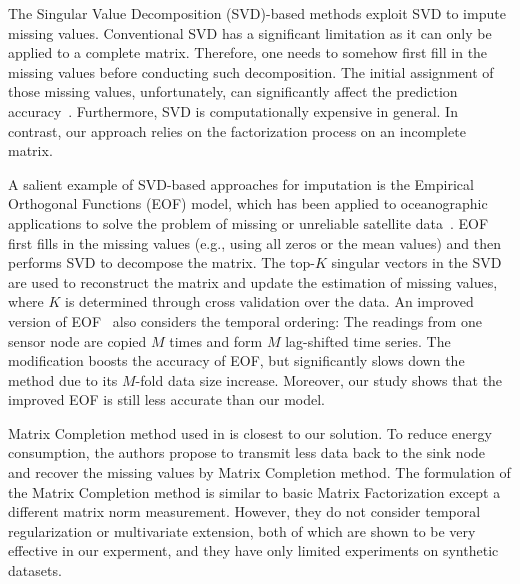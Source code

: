The Singular Value Decomposition (SVD)-based methods exploit SVD to impute missing values.
Conventional SVD has a significant
limitation as it can only be applied to a complete matrix.  Therefore,
one needs to somehow first fill in the missing values before
conducting such decomposition.  The initial assignment of those
missing values, unfortunately, can significantly affect the prediction
accuracy~\cite{koren2009matrix}.  Furthermore, SVD is computationally
expensive in general.  In contrast, our approach relies on the
factorization process on an incomplete matrix.


A salient example of SVD-based approaches for imputation is the Empirical Orthogonal Functions
(EOF) model, which has been applied to oceanographic applications to
solve the problem of missing or unreliable satellite
data~\cite{beckers2003eof}.  EOF first fills in the missing values
(e.g., using all zeros or the mean values) and then performs SVD 
to decompose the matrix. The top-$K$ singular vectors in the SVD are used 
to reconstruct the matrix and update the estimation of missing values, 
where $K$ is determined through cross validation over the data.
An improved version of EOF~\cite{kondrashov2006spatio} also 
considers the temporal ordering:
The readings from one sensor node are copied $M$ times and form $M$ lag-shifted time series.
The modification boosts the accuracy of EOF, but significantly slows down the method
due to its $M$-fold data size increase.
Moreover, our study shows that the improved EOF is still less accurate than our model.


Matrix Completion method used in \cite{majumdar2011increasing} is closest to our solution. 
To reduce energy consumption, the authors propose to transmit less data back to the sink node and 
recover the missing values by Matrix Completion method. 
The formulation of the Matrix Completion method is similar to basic Matrix Factorization except a different matrix norm measurement.
However, they do not consider temporal regularization or multivariate extension, both of which are shown to be very effective in our experment, and they have only limited experiments on synthetic datasets.


